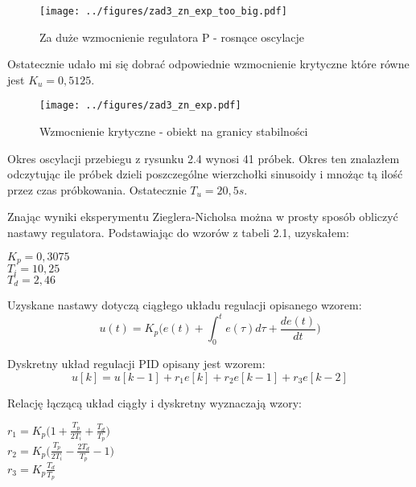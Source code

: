 \documentclass[a4paper,titlepage,11pt,floatssmall]{mwrep}
\begin{document}
\begin{figure}[H]
\centering
\texttt{[image: ../figures/zad3\_zn\_exp\_too\_big.pdf]}
\caption{Za duże wzmocnienie regulatora P - rosnące oscylacje}
\end{figure}

Ostatecznie udało mi się dobrać odpowiednie wzmocnienie krytyczne które równe jest $K_u = 0,5125$.

\begin{figure}[H]
\centering
\texttt{[image: ../figures/zad3\_zn\_exp.pdf]}
\caption{Wzmocnienie krytyczne - obiekt na granicy stabilności}
\end{figure}

\newpage

Okres oscylacji przebiegu z rysunku 2.4 wynosi 41 próbek. Okres ten znalazłem odczytując ile próbek dzieli poszczególne wierzchołki sinusoidy i mnożąc tą ilość przez czas próbkowania. Ostatecznie $T_u = 20,5s$.

Znając wyniki eksperymentu Zieglera-Nicholsa można w prosty sposób obliczyć nastawy regulatora. Podstawiając do wzorów z tabeli 2.1, uzyskałem:

\begin{center}
	$K_p = 0,3075$ \\
	
	$T_i = 10,25$ \\

	$T_d = 2,46$ \\
\end{center}

Uzyskane nastawy dotyczą ciągłego układu regulacji opisanego wzorem:
\begin{equation*}
u(t) = K_p\bigg(e(t) + \int_{0}^{t}e(\tau)d\tau + \frac{de(t)}{dt}\bigg)
\end{equation*}

Dyskretny układ regulacji PID opisany jest wzorem:
\begin{equation*}
u[k] = u[k-1] + r_1e[k] + r_2e[k-1] + r_3e[k-2]
\end{equation*}

Relację łączącą układ ciągły i dyskretny wyznaczają wzory:
\begin{center}
	$r_1 = K_p\bigg(1 + \frac{T_p}{2T_i} + \frac{T_d}{T_p}\bigg)$ \\
	
	$r_2 = K_p\bigg(\frac{T_p}{2T_i} - \frac{2T_d}{T_p} - 1 \bigg)$\\

	$r_3 = K_p\frac{T_d}{T_p}$ \\
\end{center}
\end{document}
